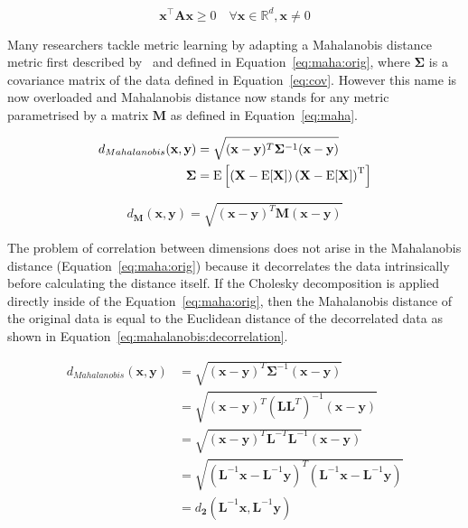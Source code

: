 \documentclass[12pt,a4paper]{report}
\begin{document}
\begin{equation}
\bm{x}^\top \bm{A}\bm{x} \geq 0 \quad \forall \bm{x} \in \mathbb{R}^d, \bm{x} \neq 0 \label{eq:psd:def}
\end{equation}


Many researchers tackle metric learning by adapting a Mahalanobis distance metric first described by~\citep{mahalanobis1936generalized} and defined in Equation~\ref{eq:maha:orig}, where $\bm{\Sigma}$ is a covariance matrix of the data defined in Equation~\ref{eq:cov}. However this name is now overloaded and Mahalanobis distance now stands for any metric parametrised by a matrix $\bm{M}$ as defined in Equation~\ref{eq:maha}.

\begin{align} \label{eq:maha:orig}
d_{Mahalanobis}(\textbf{x},\textbf{y}) &= \sqrt{(\textbf{x}-\textbf{y})^T\bm{\Sigma}^{-1}(\textbf{x}-\textbf{y})}  \\
\bm{\Sigma} &= \mathrm {E} \left[\left(\mathbf {X} -\mathrm {E} [\mathbf {X} ]\right)\left(\mathbf {X} -\mathrm {E} [\mathbf {X} ]\right)^{\rm {T}}\right] \label{eq:cov}
\end{align}

\begin{equation} \label{eq:maha}
d_{\bm{M}}(\textbf{x},\textbf{y}) = \sqrt{(\textbf{x}-\textbf{y})^T\bm{M}(\textbf{x}-\textbf{y})} 
\end{equation}

The problem of correlation between dimensions does not arise in the Mahalanobis distance (Equation~\ref{eq:maha:orig}) because it decorrelates the data intrinsically before calculating the distance itself. If the Cholesky decomposition is applied directly inside of the Equation~\ref{eq:maha:orig}, then the Mahalanobis distance of the original data is equal to the Euclidean distance of the decorrelated data as shown in Equation~\ref{eq:mahalanobis:decorrelation}.

\begin{align}
  d_{Mahalanobis}(\textbf{x},\textbf{y}) &= \sqrt{(\textbf{x}-\textbf{y})^{T}\bm{\Sigma}^{-1}(\textbf{x}-\textbf{y})} \nonumber\\
         &= \sqrt{(\textbf{x}-\textbf{y})^{T}(\bm{L}\bm{L}^{T})^{-1}(\textbf{x}-\textbf{y})} \nonumber\\
         &= \sqrt{(\textbf{x}-\textbf{y})^{T}\bm{L}^{-T}\bm{L}^{-1}(\textbf{x}-\textbf{y})} \nonumber\\
         &= \sqrt{(\bm{L}^{-1}\textbf{x}-\bm{L}^{-1}\textbf{y})^{T}(\bm{L}^{-1}\textbf{x}-\bm{L}^{-1}\textbf{y})} \nonumber\\
         &= d_{\bm{2}}(\bm{L}^{-1}\textbf{x}, \bm{L}^{-1}\textbf{y}) \label{eq:mahalanobis:decorrelation}
\end{align}
\end{document}
